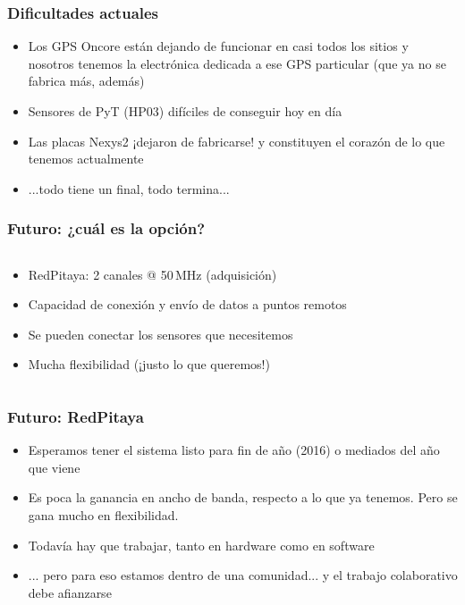 \documentclass{beamer}
\begin{document}
\begin{frame}
	\frametitle{Dificultades actuales}
	\begin{alertblock}{}
		\begin{itemize}
		\item Los GPS Oncore están dejando de funcionar en casi todos los sitios y
					nosotros tenemos la electrónica dedicada a ese GPS particular (que ya no se
					fabrica más, además)
		\item Sensores de PyT (HP03) difíciles de conseguir hoy en día
		\item Las placas Nexys2 \alert{¡dejaron de fabricarse!} y constituyen el
					corazón de lo que tenemos actualmente
		\item ...todo tiene un final, todo termina...
		\end{itemize}
	\end{alertblock}
\end{frame} 

\begin{frame}
	\frametitle{Futuro: ¿cuál es la opción?}
	\begin{columns}
		\begin{column}{0.40\textwidth}
			\begin{block}{}
	    	\begin{itemize}[<+->]
	      	\item RedPitaya: 2 canales @ 50\,MHz (adquisición)
	      	\item Capacidad de conexión y envío de datos a puntos remotos
	      	\item Se pueden conectar los sensores que necesitemos 
					\item Mucha \alert{flexibilidad} (¡justo lo que queremos!)
	    	\end{itemize}
			\end{block}
		\end{column} 
	 	\begin{column}{0.55\textwidth}
	 \end{column}
	\end{columns}
\end{frame} 

\begin{frame}
	\frametitle{Futuro: RedPitaya}
		\begin{block}{}
	  	\begin{itemize}
	    	\item Esperamos tener el sistema listo para fin de año (2016) o mediados
							del año que viene
	    	\item Es poca la ganancia en ancho de banda, respecto a lo que ya
							tenemos. Pero se gana mucho en flexibilidad.
	    	\item Todavía hay que trabajar, tanto en hardware como en software
				\item ... pero para eso estamos dentro de una comunidad... y el \alert{trabajo
							colaborativo} debe afianzarse
	  	\end{itemize}
		\end{block}
\end{frame} 
\end{document}
